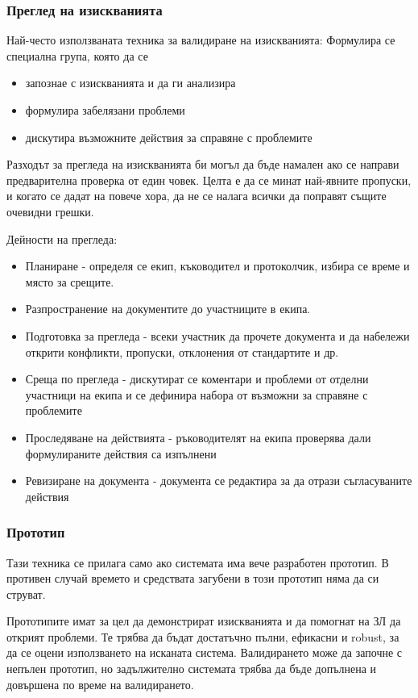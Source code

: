 \documentclass[fleqn,12pt]{article}
\begin{document}
\subsubsection{Преглед на изискванията}
Най-често използваната техника за валидиране на изискванията: Формулира се специална група, която да се

\begin{itemize}
	\item запознае с изискванията и да ги анализира
	\item формулира забелязани проблеми
	\item дискутира възможните действия за справяне с проблемите
\end{itemize}

Разходът за прегледа на изискванията би могъл да бъде намален ако се направи предварителна проверка от един човек. Целта е да се минат най-явните пропуски, и когато се дадат на повече хора, да не се налага всички да поправят същите очевидни грешки.

Дейности на прегледа:
\begin{itemize}
	\item Планиране - определя се екип, къководител и протоколчик, избира се време и място за срещите.
	\item Разпространение на документите до участниците в екипа.
	\item Подготовка за прегледа - всеки участник да прочете документа и да набележи открити конфликти, пропуски, отклонения от стандартите и др.
	\item Среща по прегледа - дискутират се коментари и проблеми от отделни участници на екипа и се дефинира набора от възможни за справяне с проблемите
	\item Проследяване на действията - ръководителят на екипа проверява дали формулираните действия са изпълнени
	\item Ревизиране на документа - документа се редактира за да отрази съгласуваните действия
\end{itemize}

\subsubsection{Прототип}
Тази техника се прилага само ако системата има вече разработен прототип. В противен случай времето и средствата загубени в този прототип няма да си струват.

Прототипите имат за цел да демонстрират изискванията и да помогнат на ЗЛ да открият проблеми. Те трябва да бъдат достатъчно пълни, ефикасни и robust, за да се оцени използването на исканата система. Валидирането може да започне с непълен прототип, но задължително системата трябва да бъде допълнена и довършена по време на валидирането.
\end{document}

